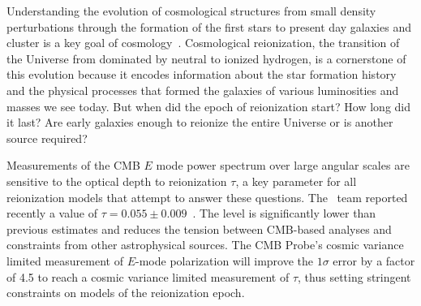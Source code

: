 \vspace{-0.05in}

Understanding the evolution of cosmological structures from small density perturbations through the formation of the
first stars to present day galaxies and cluster is a key goal of cosmology~\cite{dunlop2011}. 
Cosmological reionization, the transition of the Universe from dominated by neutral to ionized 
hydrogen, is a cornerstone of this evolution because it encodes information 
about the star formation history and the physical processes that formed the galaxies of various luminosities and masses we see today. 
But when did the epoch of reionization start?  How long did it last? Are early galaxies enough to reionize the entire Universe
or is another source required?
 
Measurements of the \ac{CMB} $E$ mode power spectrum over large angular scales are sensitive to the optical depth 
to reionization $\tau$, a key parameter for all reionization models that attempt to answer these questions. 
The \planck\ team  reported recently a value of $\tau=0.055 \pm 0.009$~\cite{planck2016_xlvi,planck2016_xxxi}.
The level is significantly lower than previous estimates and reduces the tension between CMB-based analyses and constraints from 
other astrophysical sources.  
The CMB Probe's cosmic variance limited measurement of $E$-mode polarization will 
improve the $1\sigma$ error by a factor of 4.5 to reach a cosmic 
variance limited measurement of $\tau$, thus setting 
stringent constraints on models of the reionization epoch. 


